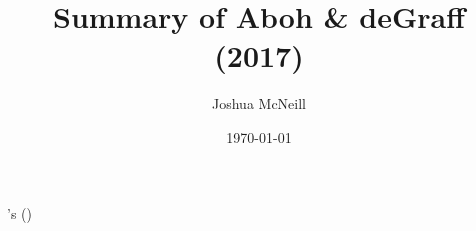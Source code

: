 \documentclass{article}
\title{Summary of Aboh \& deGraff (2017)}
\author{Joshua McNeill}
\date{\today}
\begin{document}
  \maketitle
  \onehalfspacing
    \citeauthor{roberts_null_2017}'s (\citeyear{roberts_null_2017})

    \printbibliography
\end{document}
